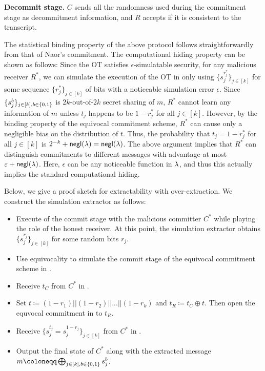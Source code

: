 \noindent\textbf{Decommit stage.} 
$C$ sends all the randomness used during the commitment stage as decommitment information, and $R$ accepts if it is consistent to the transcript. 

\smallskip
The statistical binding property of the above protocol follows straightforwardly from that of Naor's commitment. 
The computational hiding property can be shown as follows: Since the OT satisfies $\epsilon$-simulatable security, for any malicious receiver $R^*$, we can simulate the execution of the OT in  only using $\{s_j^{r^*_j}\}_{j\in [k]}$ for some sequence $\{r^*_j\}_{j\in [k]}$ of bits 
with a noticeable simulation error $\epsilon$. 
Since $\{s_j^b\}_{j\in [k],b\in\{0,1\}}$ is $2k$-out-of-$2k$ secret sharing of $m$, $R^*$ cannot learn any information of $m$ unless $t_j$ happens to be $1-r^*_j$ for all $j\in [k]$. However, by the binding property of the equivocal commitment scheme, $R^*$ can cause only a negligible bias on the distribution of $t$. Thus, the probability that $t_j=1-r^*_j$  for all $j\in [k]$ is $2^{-k}+\mathsf{negl}(\lambda)=\mathsf{negl}(\lambda)$.  
The above argument implies that $R^*$ can distinguish commitments to different messages with advantage at most $\varepsilon+\mathsf{negl}(\lambda)$. Here, $\epsilon$ can be any noticeable function in $\lambda$, and thus this actually implies the standard computational hiding. 

Below, we give a proof sketch for extractability with over-extraction. We construct the simulation extractor as follows:
\begin{itemize}
\item Execute   of the commit stage with the malicious committer $C^*$ while playing the role of the honest receiver. At this point, the simulation extractor obtains $\{s_j^{r_j}\}_{j\in[k]}$ for some random bits $r_j$. 
\item Use equivocality to simulate the commit stage of the equivocal commitment scheme in .  
\item Receive $t_C$ from $C^*$ in .  
\item Set $t\coloneqq (1-r_1)||(1-r_2)||...||(1-r_k)$ and $t_R \coloneqq t_C\oplus t$. Then open the equvocal commitment in  to $t_R$. 
\item Receive $\{s_j^{t_j}=s_j^{1-r_j}\}_{j\in [k]}$ from $C^*$ in . 
\item Output the final state of $C^*$ along with the extracted message $m\coloneqq \bigoplus_{j\in[k],b\in\bit} s_j^b$.
\end{itemize}


